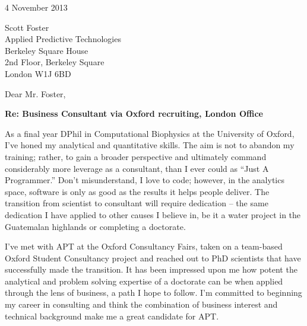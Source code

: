 \documentclass[a4paper]{../res}
\begin{document}
 
\begin{sloppypar}
 
%


\begin{resume} 
 
4 November 2013

Scott Foster \\
Applied Predictive Technologies \\
Berkeley Square House \\
2nd Floor, Berkeley Square \\
London W1J 6BD

Dear Mr. Foster, %

\textbf{Re: Business Consultant via Oxford recruiting, London Office}

As a final year DPhil in Computational Biophysics at the University of Oxford, I've honed my analytical and quantitative skills. The aim is not to abandon my training; rather, to gain a broader perspective and ultimately command considerably more leverage as a consultant, than I ever could as ``Just A Programmer.'' Don't misunderstand, I love to code; however, in the analytics space, software is only as good as the results it helps people deliver. The transition from scientist to consultant will require dedication -- the same dedication I have applied to other causes I believe in, be it a water project in the Guatemalan highlands or completing a doctorate. 

I've met with APT at the Oxford Consultancy Fairs, taken on a team-based Oxford Student Consultancy project and reached out to PhD scientists that have successfully made the transition. It has been impressed upon me how potent the analytical and problem solving expertise of a doctorate can be when applied through the lens of business, a path I hope to follow. I'm committed to beginning my career in consulting and think the combination of business interest and technical background make me a great candidate for APT. 




\end{resume}
\end{sloppypar}
\end{document}
